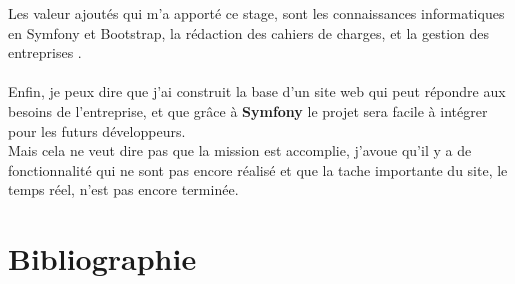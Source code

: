 \documentclass[12pt]{article}
\begin{document}
 Les valeur ajoutés qui m'a apporté ce stage,  sont  les connaissances informatiques en Symfony et Bootstrap,  la rédaction des cahiers de charges, et la gestion des entreprises .\\ \\

Enfin, je peux dire que j'ai construit la base d'un site web qui peut répondre aux besoins de l'entreprise, et que grâce à \textbf{Symfony} le projet sera facile à intégrer pour les futurs développeurs.\\
Mais cela ne veut dire pas que la mission est accomplie, j'avoue qu'il y a de fonctionnalité qui ne sont pas encore réalisé et que la tache importante du site, le temps réel, n'est pas encore terminée.\\





\newpage
\section{Bibliographie}
\end{document}
